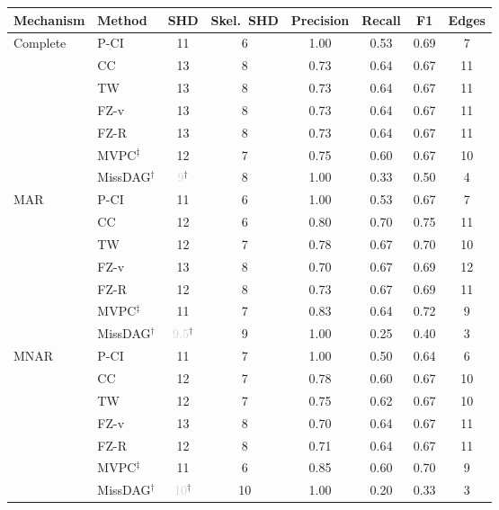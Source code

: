 \begin{tabular}{llcccccc}
    \toprule
    Mechanism & Method & SHD & Skel.\ SHD & Precision & Recall & F1 & Edges \\
    \midrule
    Complete  & P-CI               & 11 & 6 & 1.00 & 0.53 & 0.69 & 7 \\
              & CC                 & 13 & 8 & 0.73 & 0.64 & 0.67 & 11 \\
              & TW                 & 13 & 8 & 0.73 & 0.64 & 0.67 & 11 \\
              & FZ-v               & 13 & 8 & 0.73 & 0.64 & 0.67 & 11 \\
              & FZ-R               & 13 & 8 & 0.73 & 0.64 & 0.67 & 11 \\
              & MVPC$^\ddagger$    & 12 & 7 & 0.75 & 0.60 & 0.67 & 10 \\
              & MissDAG$^\dagger$  & \textcolor{lightgray}{9}$^\dagger$ & 8 & 1.00 & 0.33 & 0.50 & 4 \\
    \midrule
    MAR       & P-CI               & 11 & 6 & 1.00 & 0.53 & 0.67 & 7 \\
              & CC                 & 12 & 6 & 0.80 & 0.70 & 0.75 & 11 \\
              & TW                 & 12 & 7 & 0.78 & 0.67 & 0.70 & 10 \\
              & FZ-v               & 13 & 8 & 0.70 & 0.67 & 0.69 & 12 \\
              & FZ-R               & 12 & 8 & 0.73 & 0.67 & 0.69 & 11 \\
              & MVPC$^\ddagger$    & 11 & 7 & 0.83 & 0.64 & 0.72 & 9 \\
              & MissDAG$^\dagger$  & \textcolor{lightgray}{9.5}$^\dagger$ & 9 & 1.00 & 0.25 & 0.40 & 3 \\
    \midrule
    MNAR      & P-CI               & 11 & 7 & 1.00 & 0.50 & 0.64 & 6 \\
              & CC                 & 12 & 7 & 0.78 & 0.60 & 0.67 & 10 \\
              & TW                 & 12 & 7 & 0.75 & 0.62 & 0.67 & 10 \\
              & FZ-v               & 13 & 8 & 0.70 & 0.64 & 0.67 & 11 \\
              & FZ-R               & 12 & 8 & 0.71 & 0.64 & 0.67 & 11 \\
              & MVPC$^\ddagger$    & 11 & 6 & 0.85 & 0.60 & 0.70 & 9 \\
              & MissDAG$^\dagger$  & \textcolor{lightgray}{10}$^\dagger$ & 10 & 1.00 & 0.20 & 0.33 & 3 \\

\end{tabular}

